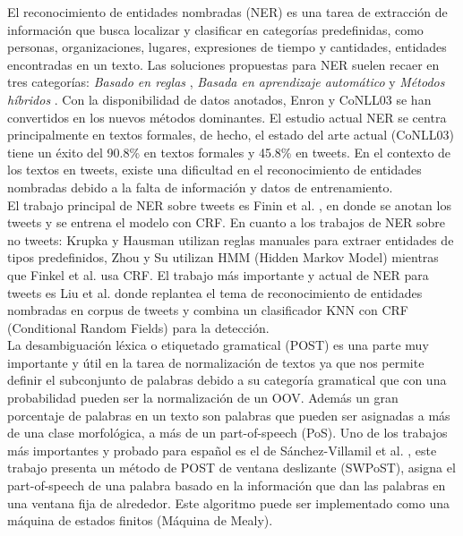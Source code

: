 \documentclass[spanish,12pt, a4paper,twoside]{paper}
\begin{document}
El reconocimiento de entidades nombradas (NER) es una tarea de extracción de información que busca localizar y clasificar en categorías predefinidas, como personas, organizaciones, lugares, expresiones de tiempo y cantidades, entidades encontradas en un texto. Las soluciones propuestas para NER suelen recaer en tres categorías: \textit{Basado en reglas} \cite{krupkahausman:1998}, \textit{Basada en aprendizaje automático} \cite{finkelmanning:2009} \cite{singh:2010} y \textit{Métodos híbridos} \cite{jansche:2002}. Con la disponibilidad de datos anotados, Enron \cite{minkov:2005} y CoNLL03 \cite{tjong:2003} se han convertidos en los nuevos métodos dominantes. El estudio actual NER se centra principalmente en textos formales, de hecho, el estado del arte actual (CoNLL03) tiene un éxito del 90.8\% en textos formales y 45.8\% en tweets. En el contexto de los textos en tweets, existe una dificultad en el reconocimiento de entidades nombradas debido a la falta de información y datos de entrenamiento.\\

El trabajo principal de NER sobre tweets es Finin et al. \cite{finin:2010}, en donde se anotan los tweets y se entrena el modelo con CRF. En cuanto a los trabajos de NER sobre no tweets: Krupka y Hausman\cite{krupkahausman:1998} utilizan reglas manuales para extraer entidades de tipos predefinidos, Zhou y Su \cite{zhousu:2002} utilizan HMM (Hidden Markov Model) mientras que Finkel et al. \cite{finkel:2005} usa CRF. El trabajo más importante y actual de NER para tweets es Liu et al. \cite{liu:2011} donde replantea el tema de reconocimiento de entidades nombradas en corpus de tweets y combina un clasificador KNN con CRF (Conditional Random Fields) para la detección.\\

La desambiguación léxica o etiquetado gramatical (POST) es una parte muy importante y útil en la tarea de normalización de textos ya que nos permite definir el subconjunto de palabras debido a su categoría gramatical que con una probabilidad pueden ser la normalización de un OOV. Además un gran porcentaje de palabras en un texto son palabras que pueden ser asignadas a más de una clase morfológica, a más de un part-of-speech (PoS). Uno de los trabajos más importantes y probado para español es el de Sánchez-Villamil et al. \cite{sanchezforcada:2004}, este trabajo presenta un método de POST de ventana deslizante (SWPoST), asigna el part-of-speech de una palabra basado en la información que dan las palabras en una ventana fija de alrededor. Este algoritmo puede ser implementado como una máquina de estados finitos (Máquina de Mealy).
\end{document}
